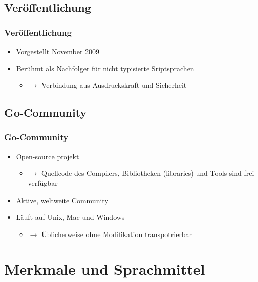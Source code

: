 \documentclass{beamer}
\begin{document}

\subsection{Ver\"offentlichung}
\begin{frame}
\frametitle{Ver\"offentlichung}

\begin{itemize}
\setlength{\itemsep}{60pt}
\item Vorgestellt November 2009
\item Ber\"uhmt als Nachfolger für nicht typisierte Sriptsprachen
\begin{itemize}
\item[] $\rightarrow$ Verbindung aus Ausdruckskraft und Sicherheit
\end{itemize}
\end{itemize}

\end{frame}


\subsection{Go-Community}
\begin{frame}
\frametitle{Go-Community}

\begin{itemize}
\setlength{\itemsep}{44pt}
\item Open-source projekt
\begin{itemize}
\item[] $\rightarrow$ Quellcode des Compilers, Bibliotheken (libraries) und Tools sind frei verfügbar
\end{itemize}
\item Aktive, weltweite Community
\item L\"auft auf Unix, Mac und Windows
\begin{itemize}
\item[] $\rightarrow$ \"Ublicherweise ohne Modifikation transpotrierbar
\end{itemize}
\end{itemize}

\end{frame}


\section{Merkmale und Sprachmittel}
\end{document}
